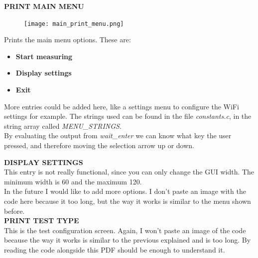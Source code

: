 \documentclass[14pt]{article}
\begin{document}
\begin{normalsize}
		\noindent\large \textbf{PRINT MAIN MENU}\normalsize\\
		
		\begin{figure}
			\texttt{[image: main\_print\_menu.png]}
		\end{figure}
		\noindent Prints the main menu options. These are:
		\begin{itemize}
			\item \textbf{Start measuring}
			\item \textbf{Display settings}
			\item \textbf{Exit}
		\end{itemize}
		More entries could be added here, like a settings menu to configure the WiFi settings for example. The strings used can be found in the file \textit{constants.c}, in the string array called \textit{MENU\_STRINGS}.\\
		
		\noindent By evaluating the output from \textit{wait\_enter} we can know what key the user pressed, and therefore moving the selection arrow up or down.\\
		
		\newpage
		
		\noindent\large \textbf{DISPLAY SETTINGS}\normalsize\\
		
		This entry is not really functional, since you can only change the GUI width. The minimum width is 60 and the maximum 120.\\
		
		In the future I would like to add more options. I don't paste an image with the code here because it too long, but the way it works is similar to the menu shown before.\\
		
		
		\noindent\large \textbf{PRINT TEST TYPE}\normalsize\\
		
		This is the test configuration screen. Again, I won't paste an image of the code because the way it works is similar to the previous explained and is too long. By reading the code alongside this PDF should be enough to understand it.\\
		

\end{normalsize}
\end{document}
